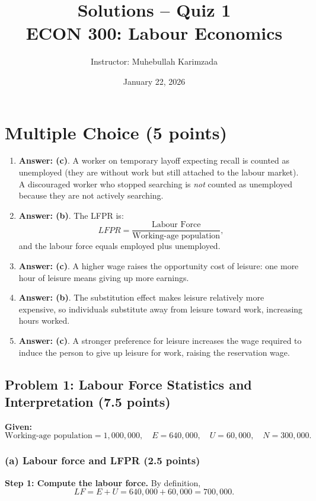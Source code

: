 \documentclass[11pt]{article}
\title{\textbf{Solutions -- Quiz 1} \vspace{ 0.4cm }\\ECON 300: Labour Economics}
\author{Instructor: Muhebullah Karimzada}
\date{January 22,  2026}
\begin{document}
\maketitle
\section*{Multiple Choice (5 points)}

\begin{enumerate}
\item \textbf{Answer: (c)}. A worker on temporary layoff expecting recall is counted as unemployed (they are without work but still attached to the labour market). A discouraged worker who stopped searching is \emph{not} counted as unemployed because they are not actively searching.

\item \textbf{Answer: (b)}. The LFPR is:
\[
LFPR = \frac{\text{Labour Force}}{\text{Working-age population}},
\]
and the labour force equals employed plus unemployed.

\item \textbf{Answer: (c)}. A higher wage raises the opportunity cost of leisure: one more hour of leisure means giving up more earnings.

\item \textbf{Answer: (b)}. The substitution effect makes leisure relatively more expensive, so individuals substitute away from leisure toward work, increasing hours worked.

\item \textbf{Answer: (c)}. A stronger preference for leisure increases the wage required to induce the person to give up leisure for work, raising the reservation wage.
\end{enumerate}


\subsection*{Problem 1: Labour Force Statistics and Interpretation (7.5 points)}

\textbf{Given:}
\[
\text{Working-age population} = 1{,}000{,}000,\quad
E = 640{,}000,\quad
U = 60{,}000,\quad
N = 300{,}000.
\]

\subsubsection*{(a) Labour force and LFPR (2.5 points)}

\textbf{Step 1: Compute the labour force.} By definition,
\[
LF = E + U = 640{,}000 + 60{,}000 = 700{,}000.
\]
\end{document}
